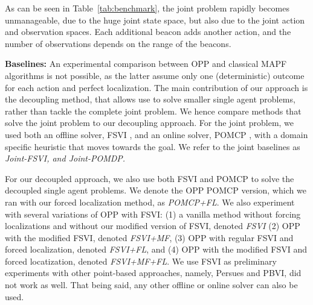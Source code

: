\documentclass[letterpaper]{article} %
\newcommand{\guy}[1]{\textcolor{blue}{[Guy: #1]}}
\begin{document}
As can be seen in Table~\ref{tab:benchmark}, the joint problem rapidly becomes unmanageable, due to the huge joint state space, but also due to the joint action and observation spaces. Each additional beacon adds another action, and the number of observations depends on the range of the beacons.


\noindent\textbf{Baselines:} An experimental comparison between OPP and classical MAPF algorithms is not possible, as the latter assume only one (deterministic) outcome for each action and perfect localization. 
The main contribution of our approach is the decoupling method, that allows use to solve smaller single agent problems, rather than tackle the complete joint problem. We hence compare methods that solve the joint problem to our decoupling approach. For the joint problem, we used both an offline solver, FSVI \cite{shani2013survey}, and an online solver, POMCP \cite{silver2010monte}, with a domain specific heuristic that moves towards the goal. We refer to the joint baselines as \em{Joint-FSVI}, and \em{Joint-POMDP}. %

For our decoupled approach, we also use both FSVI and POMCP to solve the decoupled single agent problems. We denote the OPP POMCP version, which we ran with our forced localization method, as \emph{POMCP+FL}.
We also experiment with several variations of OPP with FSVI: (1) a vanilla method without forcing localizations and without our modified version of FSVI, denoted \emph{FSVI} (2) OPP with the modified FSVI, denoted \emph{FSVI+MF},  (3) OPP with regular FSVI and forced localization, denoted \emph{FSVI+FL}, and (4) OPP with the modified FSVI and forced locatization, denoted \emph{FSVI+MF+FL}. 
We use FSVI as preliminary experiments with other point-based approaches, namely, Persues and PBVI, did not work as well. That being said, any other offline or online solver can also be used.



\end{document}
